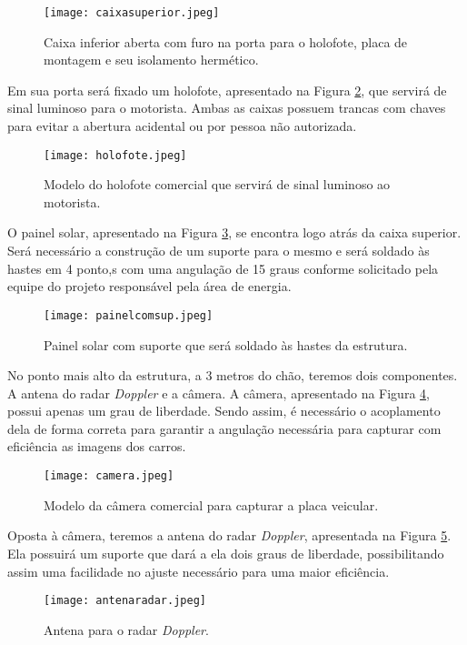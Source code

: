\begin{figure}[h]
	\centering
    \texttt{[image: caixasuperior.jpeg]}
    \caption{Caixa inferior aberta com furo na porta para o holofote, placa de montagem e seu isolamento hermético.}
    \label{caixasup}
\end{figure}

Em sua porta será fixado um holofote, apresentado na Figura \ref{holof}, que servirá de sinal luminoso para o motorista. Ambas as caixas possuem trancas com chaves para evitar a abertura acidental ou por pessoa não autorizada.

\begin{figure}[h]
	\centering
    \texttt{[image: holofote.jpeg]}
    \caption{Modelo do holofote comercial que servirá de sinal luminoso ao motorista.}
    \label{holof}
\end{figure}

O painel solar, apresentado na Figura \ref{painelsol}, se encontra logo atrás da caixa superior. Será necessário a construção de um suporte para o mesmo e será soldado às hastes em 4 ponto,s com uma angulação de 15 graus conforme solicitado pela equipe do projeto responsável pela área de energia. 

\begin{figure}[h]
	\centering
    \texttt{[image: painelcomsup.jpeg]}
    \caption{Painel solar com suporte que será soldado às hastes da estrutura.}
    \label{painelsol}
\end{figure}

No ponto mais alto da estrutura, a 3 metros do chão, teremos dois componentes. A antena do radar \textit{Doppler} e a câmera. A câmera, apresentado na Figura \ref{camera}, possui apenas um grau de liberdade. Sendo assim, é necessário o acoplamento dela de forma correta para garantir a angulação necessária para capturar com eficiência as imagens dos carros. 

\begin{figure}[h]
	\centering
    \texttt{[image: camera.jpeg]}
    \caption{Modelo da câmera comercial para capturar a placa veicular.}
    \label{camera}
\end{figure}

Oposta à câmera, teremos a antena do radar \textit{Doppler}, apresentada na Figura \ref{antrad}. Ela possuirá um suporte que dará a ela dois graus de liberdade, possibilitando assim uma facilidade no ajuste necessário para uma maior eficiência. 

\begin{figure}[h]
	\centering
    \texttt{[image: antenaradar.jpeg]}
    \caption{Antena para o radar \textit{Doppler}.}
    \label{antrad}
\end{figure}

